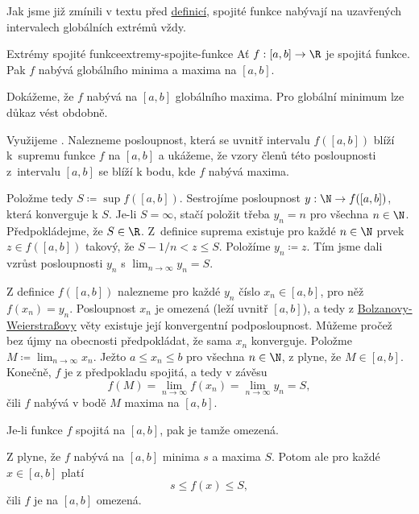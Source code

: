 Jak jsme již zmínili v textu před
\hyperref[def:lokalni-a-globalni-extrem]{definicí}, spojité funkce nabývají na
uzavřených intervalech globálních extrémů vždy.

\begin{theorem}{Extrémy spojité funkce}{extremy-spojite-funkce}
 Ať $f:[a,b] \to \R$ je spojitá funkce. Pak $f$ nabývá globálního minima a
 maxima na $[a,b]$.
\end{theorem}
\begin{thmproof}
 Dokážeme, že $f$ nabývá na $[a,b]$ globálního maxima. Pro globální minimum lze
 důkaz vést obdobně.

 Využijeme . Nalezneme
 posloupnost, která se uvnitř intervalu $f([a,b])$ blíží k~supremu funkce $f$ na
 $[a,b]$ a ukážeme, že vzory členů této posloupnosti z~intervalu $[a,b]$ se
 blíží k bodu, kde $f$ nabývá maxima.

 Položme tedy $S \coloneqq \sup f([a,b])$. Sestrojíme posloupnost $y: \N \to
 f([a,b])$, která konverguje k $S$. Je-li $S=\infty$, stačí položit třeba $y_n =
 n$ pro všechna $n \in \N$. Předpokládejme, že $S \in \R$. Z~definice suprema
 existuje pro každé $n \in \N$ prvek $z \in f([a,b])$ takový, že $S-1 / n < z
 \leq S$. Položíme $y_n \coloneqq z$. Tím jsme dali vzrůst posloupnosti $y_n$ s
 $\lim_{n \to \infty} y_n = S$.

 Z definice $f([a,b])$ nalezneme pro každé $y_n$ číslo $x_n \in [a,b]$, pro něž
 $f(x_n) = y_n$. Posloupnost $x_n$ je omezená (leží uvnitř $[a,b]$), a tedy z
 \hyperref[thm:bolzanova-weierstrassova]{Bolzanovy-Weierstraßovy} věty existuje
 její konvergentní podposloupnost. Můžeme pročež bez újmy na obecnosti
 předpokládat, že sama $x_n$ konverguje. Položme $M \coloneqq \lim_{n \to
 \infty} x_n$. Ježto $a \leq x_n \leq b$ pro všechna $n \in \N$, z
  plyne, že $M \in [a,b]$. Konečně, $f$
 je z předpokladu spojitá, a tedy v závěsu
 \[
  f(M) = \lim_{n \to \infty} f(x_n) = \lim_{n \to \infty} y_n = S,
 \]
 čili $f$ nabývá v bodě $M$ maxima na $[a,b]$.
\end{thmproof}

\begin{corollary}{}{}
 Je-li funkce $f$ spojitá na $[a,b]$, pak je tamže omezená.
\end{corollary}
\begin{corproof}
 Z  plyne, že $f$ nabývá na $[a,b]$
 minima $s$ a maxima $S$. Potom ale pro každé $x \in [a,b]$ platí
 \[
  s \leq f(x) \leq S,
 \]
 čili $f$ je na $[a,b]$ omezená.
\end{corproof}
